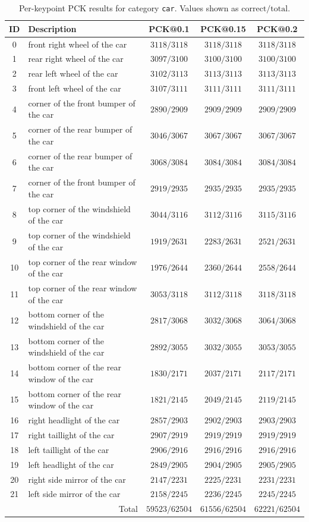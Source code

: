\begin{table}[h]
\centering
\small
\caption{Per-keypoint PCK results for category \texttt{car}. Values shown as $\text{correct}/\text{total}$.}
\label{tab:pck_car}
\begin{tabular}{cl ccc}
\toprule
ID & Description & PCK@0.1 & PCK@0.15 & PCK@0.2 \\
\midrule
0 & front right wheel of the car & $3118/3118$ & $3118/3118$ & $3118/3118$ \\
1 & rear right wheel of the car & $3097/3100$ & $3100/3100$ & $3100/3100$ \\
2 & rear left wheel of the car & $3102/3113$ & $3113/3113$ & $3113/3113$ \\
3 & front left wheel of the car & $3107/3111$ & $3111/3111$ & $3111/3111$ \\
4 & corner of the front bumper of the car & $2890/2909$ & $2909/2909$ & $2909/2909$ \\
5 & corner of the rear bumper of the car & $3046/3067$ & $3067/3067$ & $3067/3067$ \\
6 & corner of the rear bumper of the car & $3068/3084$ & $3084/3084$ & $3084/3084$ \\
7 & corner of the front bumper of the car & $2919/2935$ & $2935/2935$ & $2935/2935$ \\
8 & top corner of the windshield of the car & $3044/3116$ & $3112/3116$ & $3115/3116$ \\
9 & top corner of the windshield of the car & $1919/2631$ & $2283/2631$ & $2521/2631$ \\
10 & top corner of the rear window of the car & $1976/2644$ & $2360/2644$ & $2558/2644$ \\
11 & top corner of the rear window of the car & $3053/3118$ & $3112/3118$ & $3118/3118$ \\
12 & bottom corner of the windshield of the car & $2817/3068$ & $3032/3068$ & $3064/3068$ \\
13 & bottom corner of the windshield of the car & $2892/3055$ & $3032/3055$ & $3053/3055$ \\
14 & bottom corner of the rear window of the car & $1830/2171$ & $2037/2171$ & $2117/2171$ \\
15 & bottom corner of the rear window of the car & $1821/2145$ & $2049/2145$ & $2119/2145$ \\
16 & right headlight of the car & $2857/2903$ & $2902/2903$ & $2903/2903$ \\
17 & right taillight of the car & $2907/2919$ & $2919/2919$ & $2919/2919$ \\
18 & left taillight of the car & $2906/2916$ & $2916/2916$ & $2916/2916$ \\
19 & left headlight of the car & $2849/2905$ & $2904/2905$ & $2905/2905$ \\
20 & right side mirror of the car & $2147/2231$ & $2225/2231$ & $2231/2231$ \\
21 & left side mirror of the car & $2158/2245$ & $2236/2245$ & $2245/2245$ \\
\midrule
\multicolumn{2}{r}{Total} & $59523/62504$ & $61556/62504$ & $62221/62504$ \\
\bottomrule
\end{tabular}
\end{table}

